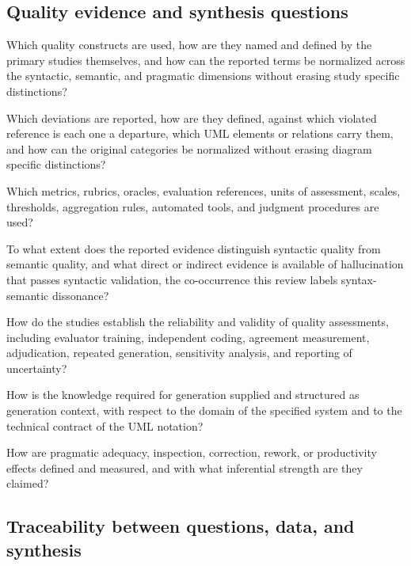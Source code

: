 \subsection{Quality evidence and synthesis questions}

\begin{description}[style=nextline,leftmargin=2.0cm,labelwidth=1.5cm]
    \item[SQ1.] Which quality constructs are used, how are they named and defined by the primary studies themselves, and how can the reported terms be normalized across the syntactic, semantic, and pragmatic dimensions without erasing study specific distinctions?
    \item[SQ2.] Which deviations are reported, how are they defined, against which violated reference is each one a departure, which UML elements or relations carry them, and how can the original categories be normalized without erasing diagram specific distinctions?
    \item[SQ3.] Which metrics, rubrics, oracles, evaluation references, units of assessment, scales, thresholds, aggregation rules, automated tools, and judgment procedures are used?
    \item[SQ4.] To what extent does the reported evidence distinguish syntactic quality from semantic quality, and what direct or indirect evidence is available of hallucination that passes syntactic validation, the co-occurrence this review labels syntax-semantic dissonance?
    \item[SQ5.] How do the studies establish the reliability and validity of quality assessments, including evaluator training, independent coding, agreement measurement, adjudication, repeated generation, sensitivity analysis, and reporting of uncertainty?
    \item[SQ6.] How is the knowledge required for generation supplied and structured as generation context, with respect to the domain of the specified system and to the technical contract of the UML notation?
    \item[SQ7.] How are pragmatic adequacy, inspection, correction, rework, or productivity effects defined and measured, and with what inferential strength are they claimed?
\end{description}

\subsection{Traceability between questions, data, and synthesis}


